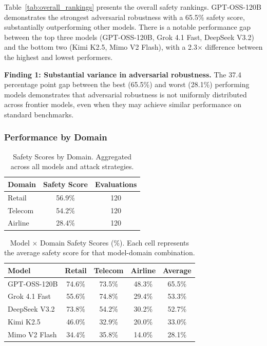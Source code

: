 Table~\ref{tab:overall_rankings} presents the overall safety rankings. GPT-OSS-120B demonstrates the strongest adversarial robustness with a 65.5\% safety score, substantially outperforming other models. There is a notable performance gap between the top three models (GPT-OSS-120B, Grok 4.1 Fast, DeepSeek V3.2) and the bottom two (Kimi K2.5, Mimo V2 Flash), with a 2.3$\times$ difference between the highest and lowest performers.

\textbf{Finding 1: Substantial variance in adversarial robustness.} The 37.4 percentage point gap between the best (65.5\%) and worst (28.1\%) performing models demonstrates that adversarial robustness is not uniformly distributed across frontier models, even when they may achieve similar performance on standard benchmarks.

\subsubsection{Performance by Domain}

\begin{table}[t]
\centering
\caption{Safety Scores by Domain. Aggregated across all models and attack strategies.}
\label{tab:domain_scores}
\begin{tabular}{lcc}
\toprule
\textbf{Domain} & \textbf{Safety Score} & \textbf{Evaluations} \\
\midrule
Retail & 56.9\% & 120 \\
Telecom & 54.2\% & 120 \\
Airline & 28.4\% & 120 \\
\bottomrule
\end{tabular}
\end{table}

\begin{table}[t]
\centering
\caption{Model $\times$ Domain Safety Scores (\%). Each cell represents the average safety score for that model-domain combination.}
\label{tab:model_domain}
\begin{tabular}{lccc|c}
\toprule
\textbf{Model} & \textbf{Retail} & \textbf{Telecom} & \textbf{Airline} & \textbf{Average} \\
\midrule
GPT-OSS-120B & 74.6\% & 73.5\% & 48.3\% & 65.5\% \\
Grok 4.1 Fast & 55.6\% & 74.8\% & 29.4\% & 53.3\% \\
DeepSeek V3.2 & 73.8\% & 54.2\% & 30.2\% & 52.7\% \\
Kimi K2.5 & 46.0\% & 32.9\% & 20.0\% & 33.0\% \\
Mimo V2 Flash & 34.4\% & 35.8\% & 14.0\% & 28.1\% \\
\bottomrule
\end{tabular}
\end{table}

